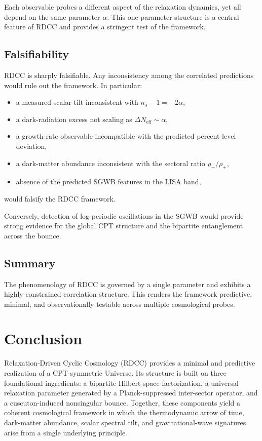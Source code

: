 \documentclass[11pt,a4paper]{article}
\begin{document}
Each observable probes a different aspect of the relaxation dynamics, yet all
depend on the same parameter $\alpha$. This one-parameter structure is a central
feature of RDCC and provides a stringent test of the framework.

\subsection{Falsifiability}

RDCC is sharply falsifiable. Any inconsistency among the correlated predictions
would rule out the framework. In particular:

\begin{itemize}
    \item a measured scalar tilt inconsistent with $n_{s} - 1 = -2\alpha$,
    \item a dark-radiation excess not scaling as $\Delta N_{\mathrm{eff}} \sim \alpha$,
    \item a growth-rate observable incompatible with the predicted percent-level
          deviation,
    \item a dark-matter abundance inconsistent with the sectoral ratio
          $\rho_{-}/\rho_{+}$,
    \item absence of the predicted SGWB features in the LISA band,
\end{itemize}

would falsify the RDCC framework.

Conversely, detection of log-periodic oscillations in the SGWB would provide
strong evidence for the global CPT structure and the bipartite entanglement
across the bounce.

\subsection{Summary}

The phenomenology of RDCC is governed by a single parameter and exhibits a
highly constrained correlation structure. This renders the framework predictive,
minimal, and observationally testable across multiple cosmological probes.

\section{Conclusion}

Relaxation-Driven Cyclic Cosmology (RDCC) provides a minimal and predictive
realization of a CPT-symmetric Universe. Its structure is built on three
foundational ingredients: a bipartite Hilbert-space factorization, a universal
relaxation parameter generated by a Planck-suppressed inter-sector operator, and
a cuscuton-induced nonsingular bounce. Together, these components yield a
coherent cosmological framework in which the thermodynamic arrow of time,
dark-matter abundance, scalar spectral tilt, and gravitational-wave signatures
arise from a single underlying principle.
\end{document}
